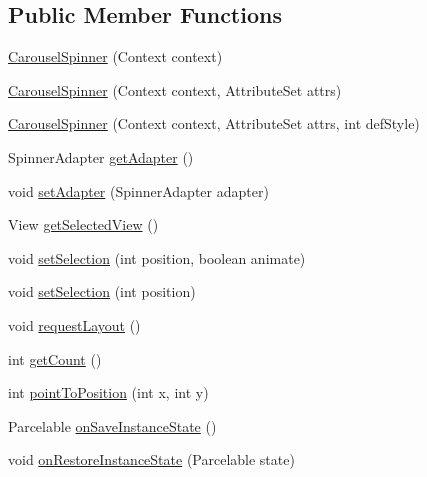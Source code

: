 \subsection*{Public Member Functions}
\begin{DoxyCompactItemize}
\item 
\hyperlink{classcom_1_1zia_1_1freshdocs_1_1widget_1_1fileexplorer_1_1carousel_1_1_carousel_spinner_ab9d03325073515c0fc01042f6886753e}{Carousel\-Spinner} (Context context)
\item 
\hyperlink{classcom_1_1zia_1_1freshdocs_1_1widget_1_1fileexplorer_1_1carousel_1_1_carousel_spinner_ad0327cb16642136ad2579cd9e5af5048}{Carousel\-Spinner} (Context context, Attribute\-Set attrs)
\item 
\hyperlink{classcom_1_1zia_1_1freshdocs_1_1widget_1_1fileexplorer_1_1carousel_1_1_carousel_spinner_a16035d3f5cdc24e7ed699e05610023b3}{Carousel\-Spinner} (Context context, Attribute\-Set attrs, int def\-Style)
\item 
Spinner\-Adapter \hyperlink{classcom_1_1zia_1_1freshdocs_1_1widget_1_1fileexplorer_1_1carousel_1_1_carousel_spinner_ab82e39b11be7d7579ed13c4853e6a6f2}{get\-Adapter} ()
\item 
void \hyperlink{classcom_1_1zia_1_1freshdocs_1_1widget_1_1fileexplorer_1_1carousel_1_1_carousel_spinner_aea24f07e048a69dbde6c78f7d0de1a38}{set\-Adapter} (Spinner\-Adapter adapter)
\item 
View \hyperlink{classcom_1_1zia_1_1freshdocs_1_1widget_1_1fileexplorer_1_1carousel_1_1_carousel_spinner_a7eb8d5c1d14816ff2b451102e31de476}{get\-Selected\-View} ()
\item 
void \hyperlink{classcom_1_1zia_1_1freshdocs_1_1widget_1_1fileexplorer_1_1carousel_1_1_carousel_spinner_a1e2e5cd42586ab0bb560f2575c093a6f}{set\-Selection} (int position, boolean animate)
\item 
void \hyperlink{classcom_1_1zia_1_1freshdocs_1_1widget_1_1fileexplorer_1_1carousel_1_1_carousel_spinner_a9120a0894b64ca45d7ef70a3768cd4a3}{set\-Selection} (int position)
\item 
void \hyperlink{classcom_1_1zia_1_1freshdocs_1_1widget_1_1fileexplorer_1_1carousel_1_1_carousel_spinner_ac38a2e0211e4723d50caa7c986846e18}{request\-Layout} ()
\item 
int \hyperlink{classcom_1_1zia_1_1freshdocs_1_1widget_1_1fileexplorer_1_1carousel_1_1_carousel_spinner_aa7c542363969ba7a8fda9bbb262c292e}{get\-Count} ()
\item 
int \hyperlink{classcom_1_1zia_1_1freshdocs_1_1widget_1_1fileexplorer_1_1carousel_1_1_carousel_spinner_a42d30e7b5a01904bca18bac992fb303c}{point\-To\-Position} (int x, int y)
\item 
Parcelable \hyperlink{classcom_1_1zia_1_1freshdocs_1_1widget_1_1fileexplorer_1_1carousel_1_1_carousel_spinner_a5d16a33167f65a66c9abfb58a7318f87}{on\-Save\-Instance\-State} ()
\item 
void \hyperlink{classcom_1_1zia_1_1freshdocs_1_1widget_1_1fileexplorer_1_1carousel_1_1_carousel_spinner_a5c456bb4c4e01c7e94b2d46e81278191}{on\-Restore\-Instance\-State} (Parcelable state)
\end{DoxyCompactItemize}
